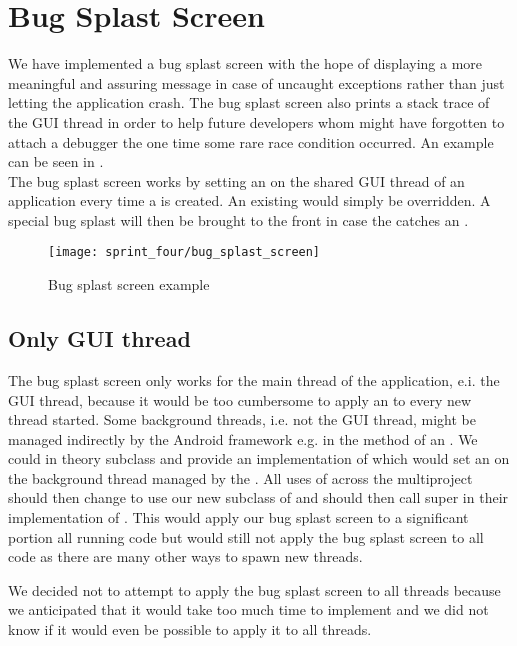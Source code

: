 
\section{Bug Splast Screen}
\label{sec:bug_splast_screen}

We have implemented a bug splast screen with the hope of displaying a more meaningful and assuring message in case of uncaught exceptions rather than just letting the application crash. The bug splast screen also prints a stack trace of the GUI thread in order to help future developers whom might have forgotten to attach a debugger the one time some rare race condition occurred. An example can be seen in .\\

The bug splast screen works by setting an  on the shared GUI thread of an application every time a  is created. An existing  would simply be overridden. A special bug splast  will then be brought to the front in case the  catches an .

\begin{figure}[!htbp]
        \centering
        \texttt{[image: sprint\_four/bug\_splast\_screen]}
        \caption{Bug splast screen example}
        \label{fig:bug_splast_screen_example}
\end{figure}

\subsection{Only GUI thread} 
The bug splast screen only works for the main thread of the application, e.i. the GUI thread, because it would be too cumbersome to apply an  to every new thread started. Some background threads, i.e. not the GUI thread, might be managed indirectly by the Android framework e.g. in the  method of an . We could in theory subclass  and provide an implementation of  which would set an  on the background thread managed by the . All uses of  across the \giraf multiproject should then change to use our new subclass of  and should then call super in their implementation of . This would apply our bug splast screen to a significant portion all running code but would still not apply the bug splast screen to all code as there are many other ways to spawn new threads. 

We decided not to attempt to apply the bug splast screen to all threads because we anticipated that it would take too much time to implement and we did not know if it would even be possible to apply it to all threads.          
